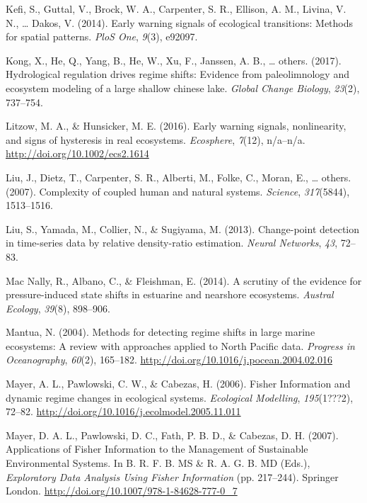 \documentclass[12pt,twoside,openany]{reedthesis}
\begin{document}
\hypertarget{ref-kefi2014early}{}
Kefi, S., Guttal, V., Brock, W. A., Carpenter, S. R., Ellison, A. M.,
Livina, V. N., \ldots{} Dakos, V. (2014). Early warning signals of
ecological transitions: Methods for spatial patterns. \emph{PloS One},
\emph{9}(3), e92097.

\hypertarget{ref-kong2017hydrological}{}
Kong, X., He, Q., Yang, B., He, W., Xu, F., Janssen, A. B., \ldots{}
others. (2017). Hydrological regulation drives regime shifts: Evidence
from paleolimnology and ecosystem modeling of a large shallow chinese
lake. \emph{Global Change Biology}, \emph{23}(2), 737--754.

\hypertarget{ref-litzow_early_2016}{}
Litzow, M. A., \& Hunsicker, M. E. (2016). Early warning signals,
nonlinearity, and signs of hysteresis in real ecosystems.
\emph{Ecosphere}, \emph{7}(12), n/a--n/a.
\url{http://doi.org/10.1002/ecs2.1614}

\hypertarget{ref-liu_complexity_2007}{}
Liu, J., Dietz, T., Carpenter, S. R., Alberti, M., Folke, C., Moran, E.,
\ldots{} others. (2007). Complexity of coupled human and natural
systems. \emph{Science}, \emph{317}(5844), 1513--1516.

\hypertarget{ref-liu2013change}{}
Liu, S., Yamada, M., Collier, N., \& Sugiyama, M. (2013). Change-point
detection in time-series data by relative density-ratio estimation.
\emph{Neural Networks}, \emph{43}, 72--83.

\hypertarget{ref-mac2014scrutiny}{}
Mac Nally, R., Albano, C., \& Fleishman, E. (2014). A scrutiny of the
evidence for pressure-induced state shifts in estuarine and nearshore
ecosystems. \emph{Austral Ecology}, \emph{39}(8), 898--906.

\hypertarget{ref-mantua_methods_2004}{}
Mantua, N. (2004). Methods for detecting regime shifts in large marine
ecosystems: A review with approaches applied to North Pacific data.
\emph{Progress in Oceanography}, \emph{60}(2), 165--182.
\url{http://doi.org/10.1016/j.pocean.2004.02.016}

\hypertarget{ref-mayer_fisher_2006}{}
Mayer, A. L., Pawlowski, C. W., \& Cabezas, H. (2006). Fisher
Information and dynamic regime changes in ecological systems.
\emph{Ecological Modelling}, \emph{195}(1???2), 72--82.
\url{http://doi.org/10.1016/j.ecolmodel.2005.11.011}

\hypertarget{ref-mayer_applications_2007}{}
Mayer, D. A. L., Pawlowski, D. C., Fath, P. B. D., \& Cabezas, D. H.
(2007). Applications of Fisher Information to the Management of
Sustainable Environmental Systems. In B. R. F. B. MS \& R. A. G. B. MD
(Eds.), \emph{Exploratory Data Analysis Using Fisher Information} (pp.
217--244). Springer London.
\url{http://doi.org/10.1007/978-1-84628-777-0_7}
\end{document}
